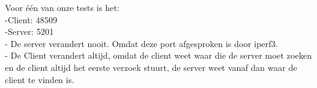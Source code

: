 Voor één van onze tests is het: \\

-Client: 48509 \\
-Server: 5201 \\

- De server verandert nooit. Omdat deze port afgesproken is door iperf3. \\
- De Client verandert altijd, omdat de client weet waar die de server moet zoeken en de client altijd het eerste verzoek stuurt, de server weet vanaf dan waar de client te vinden is.